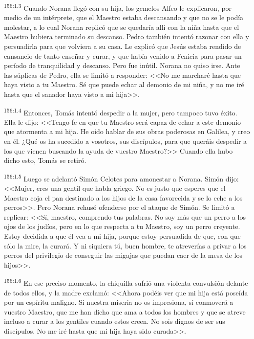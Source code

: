 \par 
\textsuperscript{156:1.3} Cuando Norana llegó con su hija, los gemelos Alfeo le explicaron, por medio de un intérprete, que el Maestro estaba descansando y que no se le podía molestar, a lo cual Norana replicó que se quedaría allí con la niña hasta que el Maestro hubiera terminado su descanso. Pedro también intentó razonar con ella y persuadirla para que volviera a su casa. Le explicó que Jesús estaba rendido de cansancio de tanto enseñar y curar, y que había venido a Fenicia para pasar un período de tranquilidad y descanso. Pero fue inútil. Norana no quiso irse. Ante las súplicas de Pedro, ella se limitó a responder: <<No me marcharé hasta que haya visto a tu Maestro. Sé que puede echar al demonio de mi niña, y no me iré hasta que el sanador haya visto a mi hija>>.

\par 
\textsuperscript{156:1.4} Entonces, Tomás intentó despedir a la mujer, pero tampoco tuvo éxito. Ella le dijo: <<Tengo fe en que tu Maestro será capaz de echar a este demonio que atormenta a mi hija. He oído hablar de sus obras poderosas en Galilea, y creo en él. ¿Qué os ha sucedido a vosotros, sus discípulos, para que queráis despedir a los que vienen buscando la ayuda de vuestro Maestro?>> Cuando ella hubo dicho esto, Tomás se retiró.

\par 
\textsuperscript{156:1.5} Luego se adelantó Simón Celotes para amonestar a Norana. Simón dijo: <<Mujer, eres una gentil que habla griego. No es justo que esperes que el Maestro coja el pan destinado a los hijos de la casa favorecida y se lo eche a los perros>>. Pero Norana rehusó ofenderse por el ataque de Simón. Se limitó a replicar: <<Sí, maestro, comprendo tus palabras. No soy más que un perro a los ojos de los judíos, pero en lo que respecta a tu Maestro, soy un perro creyente. Estoy decidida a que él vea a mi hija, porque estoy persuadida de que, con que sólo la mire, la curará. Y ni siquiera tú, buen hombre, te atreverías a privar a los perros del privilegio de conseguir las migajas que puedan caer de la mesa de los hijos>>.

\par 
\textsuperscript{156:1.6} En ese preciso momento, la chiquilla sufrió una violenta convulsión delante de todos ellos, y la madre exclamó: <<Ahora podéis ver que mi hija está poseída por un espíritu maligno. Si nuestra miseria no os impresiona, sí conmoverá a vuestro Maestro, que me han dicho que ama a todos los hombres y que se atreve incluso a curar a los gentiles cuando estos creen. No sois dignos de ser sus discípulos. No me iré hasta que mi hija haya sido curada>>.

